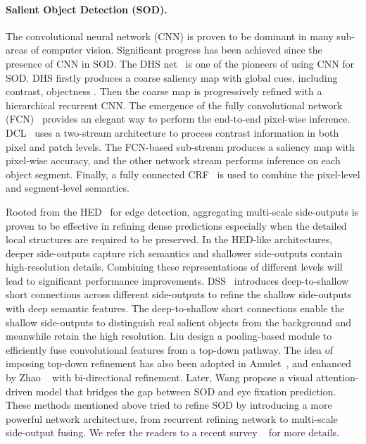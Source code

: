 \documentclass[10pt,twocolumn,letterpaper]{article}
\begin{document}
\paragraph{Salient Object Detection (SOD).}
The convolutional neural network (CNN) is proven to be dominant in many sub-areas
of computer vision.
%
Significant progress has been achieved since the presence of CNN in SOD.
%
The DHS net~\cite{liu2016dhsnet} is one of the pioneers of using CNN for SOD.
%
DHS firstly produces a coarse saliency map with global cues, including contrast, objectness \etal.
Then the coarse map is progressively refined with a hierarchical recurrent CNN.
%
The emergence of the fully convolutional network (FCN)~\cite{long2015fully} provides an 
elegant way to perform the end-to-end pixel-wise inference.
%
DCL~\cite{li2016deep} uses a two-stream architecture to process contrast information 
in both pixel and patch levels.
%
%
The FCN-based sub-stream produces a saliency map with pixel-wise accuracy, 
and the other network stream performs inference on each object segment.
%
Finally, a fully connected CRF~\cite{krahenbuhl2011efficient} is used to 
combine the pixel-level and segment-level semantics.


%
Rooted from the HED~\cite{xie2015holistically} for edge detection,
aggregating multi-scale side-outputs is proven to be effective in refining dense  predictions
especially when the detailed local structures are required to be preserved.
%
In the HED-like architectures, deeper side-outputs capture rich semantics and
shallower side-outputs contain high-resolution details.
%
Combining these representations of different levels will lead to significant performance
improvements.
%
DSS~\cite{hou2017deeply} introduces deep-to-shallow short connections
across different side-outputs to refine the shallow side-outputs with deep semantic features.
%
The deep-to-shallow short connections enable the shallow side-outputs to
distinguish real salient objects from the background
and meanwhile retain the high resolution.
%
Liu \etal \cite{Liu2019PoolSal} design a pooling-based module to
efficiently fuse convolutional features from a top-down pathway.
%
The idea of imposing top-down refinement has also
been adopted in Amulet~\cite{zhang2017amulet},
and enhanced by Zhao \etal~\cite{zhao2018hifi} with bi-directional refinement.
Later, Wang \etal \cite{wang2018salient} propose a visual attention-driven model
that bridges the gap between SOD and eye fixation prediction.
%
These methods mentioned above tried to refine SOD by
introducing a more powerful network architecture, 
from recurrent refining network to multi-scale side-output fusing.
%
We refer the readers to a recent survey ~\cite{BorjiCVM2019} for more details.
\end{document}
